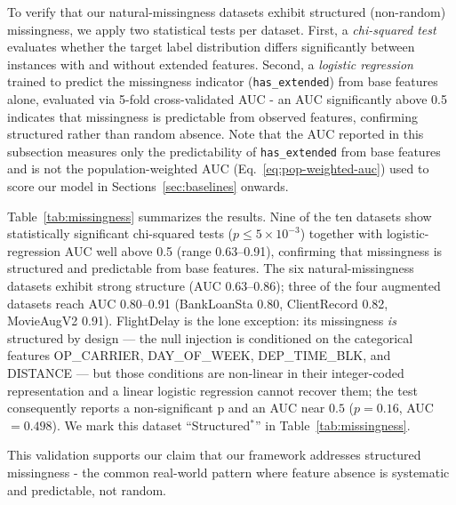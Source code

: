 \documentclass[sigconf]{acmart}
\begin{document}
\begin{itemize}
To verify that our natural-missingness datasets exhibit structured (non-random) missingness, we apply two statistical tests per dataset. First, a \textit{chi-squared test} evaluates whether the target label distribution differs significantly between instances with and without extended features. Second, a \textit{logistic regression} trained to predict the missingness indicator (\texttt{has\_extended}) from base features alone, evaluated via 5-fold cross-validated AUC - an AUC significantly above 0.5 indicates that missingness is predictable from observed features, confirming structured rather than random absence. Note that the AUC reported in this subsection measures only the predictability of \texttt{has\_extended} from base features and is not the population-weighted AUC (Eq.~\ref{eq:pop-weighted-auc}) used to score our model in Sections~\ref{sec:baselines} onwards.

Table~\ref{tab:missingness} summarizes the results. Nine of the ten datasets show statistically significant chi-squared tests ($p \le 5\times10^{-3}$) together with logistic-regression AUC well above 0.5 (range 0.63--0.91), confirming that missingness is structured and predictable from base features. The six natural-missingness datasets exhibit strong structure (AUC 0.63--0.86); three of the four augmented datasets reach AUC 0.80--0.91 (BankLoanSta 0.80, ClientRecord 0.82, MovieAugV2 0.91). FlightDelay is the lone exception: its missingness \emph{is} structured by design --- the null injection is conditioned on the categorical features OP\_CARRIER, DAY\_OF\_WEEK, DEP\_TIME\_BLK, and DISTANCE --- but those conditions are non-linear in their integer-coded representation and a linear logistic regression cannot recover them; the test consequently reports a non-significant p and an AUC near $0.5$ ($p=0.16$, AUC $=0.498$). We mark this dataset ``Structured$^{*}$'' in Table~\ref{tab:missingness}.

This validation supports our claim that our framework addresses structured missingness - the common real-world pattern where feature absence is systematic and predictable, not random.


\end{itemize}
\end{document}
